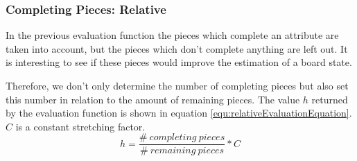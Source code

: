 \subsubsection*{Completing Pieces: Relative}
In the previous evaluation function the pieces which complete an attribute are taken into account, but the pieces which don't complete anything are left out. It is interesting to see if these pieces would improve the estimation of a board state.

Therefore, we don't only determine the number of completing pieces but also set this number in relation to the amount of remaining pieces. The value $h$ returned by the evaluation function is shown in equation \ref{equ:relativeEvaluationEquation}. $C$ is a constant stretching factor.
\begin{equation}
	\label{equ:relativeEvaluationEquation}
	h=\frac{\#~completing~pieces}{\#~remaining~pieces}*C
\end{equation}

